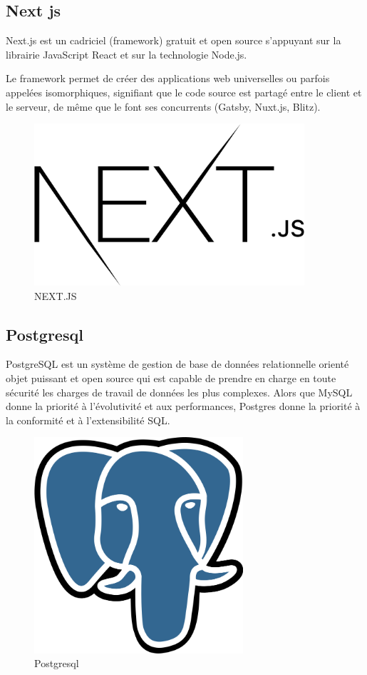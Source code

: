 \subsection{Next js}

Next.js est un cadriciel (framework) gratuit et open source s'appuyant sur la librairie JavaScript React et sur la technologie Node.js.

Le framework permet de créer des applications web universelles ou parfois appelées isomorphiques, signifiant que le code source est partagé entre le client et le serveur, de même que le font ses concurrents (Gatsby, Nuxt.js, Blitz).

\begin{figure}[!h]
\begin{center}
\includegraphics[height=6cm]{Nextjs.svg.png}
\end{center}
\caption{NEXT.JS}
\end{figure}

\subsection{Postgresql}

PostgreSQL est un système de gestion de base de données relationnelle orienté objet puissant et open source qui est capable de prendre en charge en toute sécurité les charges de travail de données les plus complexes. Alors que MySQL donne la priorité à l'évolutivité et aux performances, Postgres donne la priorité à la conformité et à l'extensibilité SQL.

\begin{figure}[!h]
\begin{center}
\includegraphics[height=8cm]{Postgresql.svg.png}
\end{center}
\caption{Postgresql}
\end{figure}



